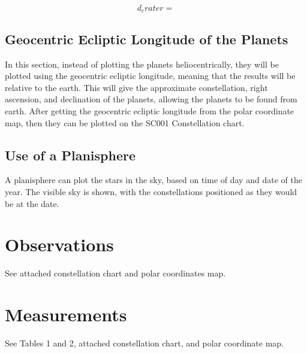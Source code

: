 \documentclass{article}
\begin{document}
\begin{equation}
d_crater  = 
\end{equation}

\subsection{Geocentric Ecliptic Longitude of the Planets}
In this section, instead of plotting the planets heliocentrically, they will be plotted using the geocentric ecliptic longitude, meaning that the results will be relative to the earth.  This will give the approximate constellation, right ascension, and declination of the planets, allowing the planets to be found from earth.  After getting the geocentric ecliptic longitude from the polar coordinate map, then they can be plotted on the SC001 Constellation chart.
\subsection{Use of a Planisphere}
A planisphere can plot the stars in the sky, based on time of day and date of the year.  The visible sky is shown, with the constellations positioned as they would be at the date. 
\section{Observations}
See attached constellation chart and polar coordinates map. 
\section{Measurements}
See Tables 1 and 2, attached constellation chart, and polar coordinate map.
\end{document}
